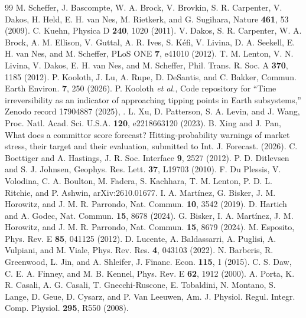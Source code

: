 \begin{thebibliography}{99}
 M. Scheffer, J. Bascompte, W. A. Brock, V. Brovkin, S. R. Carpenter, V. Dakos, H. Held, E. H. van Nes, M. Rietkerk, and G. Sugihara, Nature \textbf{461}, 53 (2009).
 C. Kuehn, Physica D \textbf{240}, 1020 (2011).
 V. Dakos, S. R. Carpenter, W. A. Brock, A. M. Ellison, V. Guttal, A. R. Ives, S. K\'efi, V. Livina, D. A. Seekell, E. H. van Nes, and M. Scheffer, PLoS ONE \textbf{7}, e41010 (2012).
 T. M. Lenton, V. N. Livina, V. Dakos, E. H. van Nes, and M. Scheffer, Phil. Trans. R. Soc. A \textbf{370}, 1185 (2012).
 P. Kooloth, J. Lu, A. Rupe, D. DeSantis, and C. Bakker, Commun. Earth Environ. \textbf{7}, 250 (2026).
 P. Kooloth \textit{et al.}, Code repository for ``Time irreversibility as an indicator of approaching tipping points in Earth subsystems,'' Zenodo record 17904887 (2025), .
 L. Xu, D. Patterson, S. A. Levin, and J. Wang, Proc. Natl. Acad. Sci. U.S.A. \textbf{120}, e2218663120 (2023).
 B. Xing and J. Pan, What does a committor score forecast? Hitting-probability warnings of market stress, their target and their evaluation, submitted to Int. J. Forecast. (2026).%
 C. Boettiger and A. Hastings, J. R. Soc. Interface \textbf{9}, 2527 (2012).
 P. D. Ditlevsen and S. J. Johnsen, Geophys. Res. Lett. \textbf{37}, L19703 (2010).
 F. Du Plessis, V. Volodina, C. A. Boulton, M. Fadera, S. Kachhara, T. M. Lenton, P. D. L. Ritchie, and P. Ashwin, arXiv:2610.01677.
 I. A. Mart\'inez, G. Bisker, J. M. Horowitz, and J. M. R. Parrondo, Nat. Commun. \textbf{10}, 3542 (2019).
 D. Hartich and A. Godec, Nat. Commun. \textbf{15}, 8678 (2024).
 G. Bisker, I. A. Mart\'inez, J. M. Horowitz, and J. M. R. Parrondo, Nat. Commun. \textbf{15}, 8679 (2024).
 M. Esposito, Phys. Rev. E \textbf{85}, 041125 (2012).
 D. Lucente, A. Baldassarri, A. Puglisi, A. Vulpiani, and M. Viale, Phys. Rev. Res. \textbf{4}, 043103 (2022).
 N. Barberis, R. Greenwood, L. Jin, and A. Shleifer, J. Financ. Econ. \textbf{115}, 1 (2015).
 C. S. Daw, C. E. A. Finney, and M. B. Kennel, Phys. Rev. E \textbf{62}, 1912 (2000).
 A. Porta, K. R. Casali, A. G. Casali, T. Gnecchi-Ruscone, E. Tobaldini, N. Montano, S. Lange, D. Geue, D. Cysarz, and P. Van Leeuwen, Am. J. Physiol. Regul. Integr. Comp. Physiol. \textbf{295}, R550 (2008).

\end{thebibliography}
